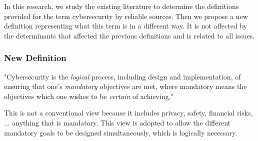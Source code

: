 In this research, we study the existing literature to determine the definitions provided for the term cybersecurity by reliable sources. Then we propose a new definition representing what this term is in a different way.  It is not affected by the determinants that affected the previous definitions and is related to all issues.
\subsubsection*{New Definition}
"Cybersecurity is the {\em logical} process, including design and implementation, of ensuring that one's {\em mandatory} objectives are met, where mandatory means the objectives which one wishes to be {\em certain} of achieving."

This is not a conventional view because it includes privacy, safety, financial risks, ...
anything that is mandatory. This view is adopted to allow the different mandatory goals
to be designed simultaneously, which is logically necessary.
